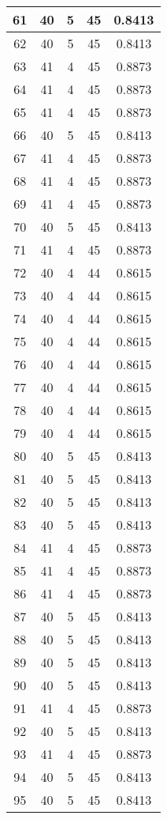 \documentclass[letterpaper, 12pt]{article}
\begin{document}
\begin{longtable}{|c|c|c|c|c|}
61 & 40 & 5 & 45 & 0.8413 \\
\hline
62 & 40 & 5 & 45 & 0.8413 \\
\hline
63 & 41 & 4 & 45 & 0.8873 \\
\hline
64 & 41 & 4 & 45 & 0.8873 \\
\hline
65 & 41 & 4 & 45 & 0.8873 \\
\hline
66 & 40 & 5 & 45 & 0.8413 \\
\hline
67 & 41 & 4 & 45 & 0.8873 \\
\hline
68 & 41 & 4 & 45 & 0.8873 \\
\hline
69 & 41 & 4 & 45 & 0.8873 \\
\hline
70 & 40 & 5 & 45 & 0.8413 \\
\hline
71 & 41 & 4 & 45 & 0.8873 \\
\hline
72 & 40 & 4 & 44 & 0.8615 \\
\hline
73 & 40 & 4 & 44 & 0.8615 \\
\hline
74 & 40 & 4 & 44 & 0.8615 \\
\hline
75 & 40 & 4 & 44 & 0.8615 \\
\hline
76 & 40 & 4 & 44 & 0.8615 \\
\hline
77 & 40 & 4 & 44 & 0.8615 \\
\hline
78 & 40 & 4 & 44 & 0.8615 \\
\hline
79 & 40 & 4 & 44 & 0.8615 \\
\hline
80 & 40 & 5 & 45 & 0.8413 \\
\hline
81 & 40 & 5 & 45 & 0.8413 \\
\hline
82 & 40 & 5 & 45 & 0.8413 \\
\hline
83 & 40 & 5 & 45 & 0.8413 \\
\hline
84 & 41 & 4 & 45 & 0.8873 \\
\hline
85 & 41 & 4 & 45 & 0.8873 \\
\hline
86 & 41 & 4 & 45 & 0.8873 \\
\hline
87 & 40 & 5 & 45 & 0.8413 \\
\hline
88 & 40 & 5 & 45 & 0.8413 \\
\hline
89 & 40 & 5 & 45 & 0.8413 \\
\hline
90 & 40 & 5 & 45 & 0.8413 \\
\hline
91 & 41 & 4 & 45 & 0.8873 \\
\hline
92 & 40 & 5 & 45 & 0.8413 \\
\hline
93 & 41 & 4 & 45 & 0.8873 \\
\hline
94 & 40 & 5 & 45 & 0.8413 \\
\hline
95 & 40 & 5 & 45 & 0.8413 \\

\end{longtable}
\end{document}
